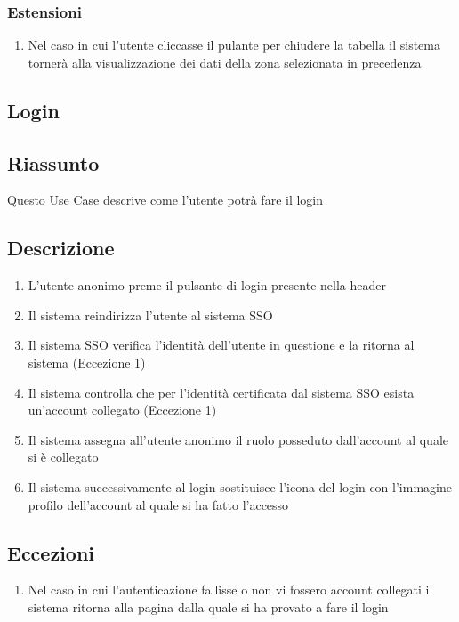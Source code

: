         \subsubsection{Estensioni}
            \begin{enumerate}
                \item Nel caso in cui l'utente cliccasse il pulante per chiudere la tabella il sistema tornerà alla visualizzazione dei dati della zona selezionata in precedenza
            \end{enumerate}

    \subsection{Login}
        \subsection{Riassunto}
            Questo Use Case descrive come l'utente potrà fare il login
        \subsection{Descrizione}
            \begin{enumerate}
                \item L'utente anonimo preme il pulsante di login presente nella header
                \item Il sistema reindirizza l'utente al sistema SSO
                \item Il sistema SSO verifica l'identità dell'utente in questione e la ritorna al sistema (Eccezione 1)
                \item Il sistema controlla che per l'identità certificata dal sistema SSO esista un'account collegato (Eccezione 1)
                \item Il sistema assegna all'utente anonimo il ruolo posseduto dall'account al quale si è collegato
                \item Il sistema successivamente al login sostituisce l'icona del login con l'immagine profilo dell'account al quale si ha fatto l'accesso
            \end{enumerate}
        \subsection{Eccezioni}
            \begin{enumerate}
                \item Nel caso in cui l'autenticazione fallisse o non vi fossero account collegati il sistema ritorna alla pagina dalla quale si ha provato a fare il login
            \end{enumerate}


